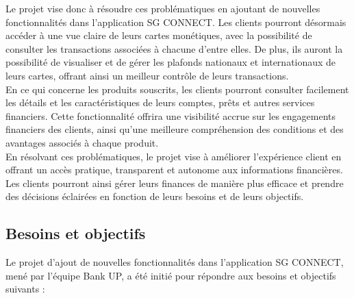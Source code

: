 Le projet vise donc à résoudre ces problématiques en ajoutant de nouvelles fonctionnalités dans l'application SG CONNECT. Les clients pourront désormais accéder à une vue claire de leurs cartes monétiques, avec la possibilité de consulter les transactions associées à chacune d'entre elles. De plus, ils auront la possibilité de visualiser et de gérer les plafonds nationaux et internationaux de leurs cartes, offrant ainsi un meilleur contrôle de leurs transactions.\\

En ce qui concerne les produits souscrits, les clients pourront consulter facilement les détails et les caractéristiques de leurs comptes, prêts et autres services financiers. Cette fonctionnalité offrira une visibilité accrue sur les engagements financiers des clients, ainsi qu'une meilleure compréhension des conditions et des avantages associés à chaque produit.\\

En résolvant ces problématiques, le projet vise à améliorer l'expérience client en offrant un accès pratique, transparent et autonome aux informations financières. Les clients pourront ainsi gérer leurs finances de manière plus efficace et prendre des décisions éclairées en fonction de leurs besoins et de leurs objectifs.

\subsection{Besoins et objectifs}
Le projet d'ajout de nouvelles fonctionnalités dans l'application SG CONNECT, mené par l'équipe Bank UP, a été initié pour répondre aux besoins et objectifs suivants :

